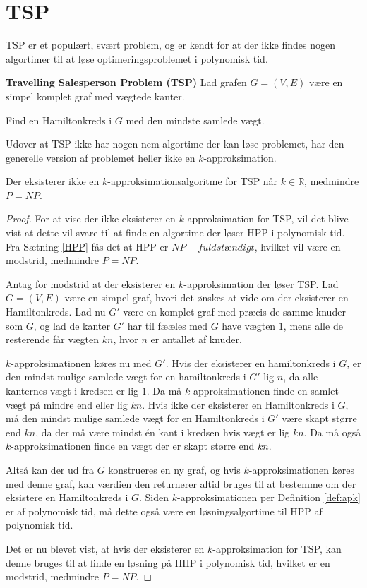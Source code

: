 \section{TSP}
TSP er et populært, svært problem, og er kendt for at der ikke findes nogen algortimer til at løse optimeringsproblemet i polynomisk tid. 

\begin{tcolorbox}
	\textbf{Travelling Salesperson Problem (TSP)} \quad Lad grafen $G=(V,E)$ være en simpel komplet graf med vægtede kanter.

	Find en Hamiltonkreds i $G$ med den mindste samlede vægt.
\end{tcolorbox}

Udover at TSP ikke har nogen nem algortime der kan løse problemet, har den generelle version af problemet heller ikke en $k$-approksimation.

\begin{thm}
	Der eksisterer ikke en $k$-approksimationsalgoritme for TSP når $k \in \mathbb{R}$, medmindre $P = NP$.
\end{thm}
\begin{proof}
	For at vise der ikke eksisterer en $k$-approksimation for TSP, vil det blive vist at dette vil svare til at finde en algortime der løser HPP i polynomisk tid.
	Fra Sætning \ref{HPP} fås det at HPP er $NP-fuldstændigt$, hvilket vil være en modstrid, medmindre $P=NP$.

	Antag for modstrid at der eksisterer en $k$-approksimation der løser TSP.
	Lad $G=(V,E)$ være en simpel graf, hvori det ønskes at vide om der eksisterer en Hamiltonkreds.
	Lad nu $G'$ være en komplet graf med præcis de samme knuder som $G$, og lad de kanter $G'$ har til fææles med $G$ have vægten $1$, mens alle de resterende får vægten $kn$, hvor $n$ er antallet af knuder.

	$k$-approksimationen køres nu med $G'$.
	Hvis der eksisterer en hamiltonkreds i $G$, er den mindst mulige samlede vægt for en hamiltonkreds i $G'$ lig $n$, da alle kanternes vægt i kredsen er lig $1$.
	Da må $k$-approksimationen finde en samlet vægt på mindre end eller lig $kn$.
	Hvis ikke der eksisterer en Hamiltonkreds i $G$, må den mindst mulige samlede vægt for en Hamiltonkreds i $G'$ være skapt større end $kn$, da der må være mindst én kant i kredsen hvis vægt er lig $kn$.
	Da må også $k$-approksimationen finde en vægt der er skapt større end $kn$.

	Altså kan der ud fra $G$ konstrueres en ny graf, og hvis $k$-approksimationen køres med denne graf, kan værdien den returnerer altid bruges til at bestemme om der eksistere en Hamiltonkreds i $G$.
	Siden $k$-approksimationen per Definition \ref{def:apk} er af polynomisk tid, må dette også være en løsningsalgortime til HPP af polynomisk tid.

	Det er nu blevet vist, at hvis der eksisterer en $k$-approksimation for TSP, kan denne bruges til at finde en løsning på HHP i polynomisk tid, hvilket er en modstrid, medmindre $P=NP$.
\end{proof}

